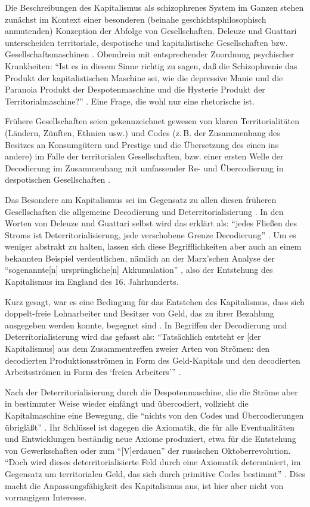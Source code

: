 \documentclass[12pt,
               DIV13,
               paper=a4,
               twoside=false,
               onehalfspacing,
               bibliography=totoc,
               toc=graduated,
               draft,
               ]{scrartcl}
\newcommand{\pc}[2]{\parencite[#1]{#2}}
\newcommand{\vgl}[2]{\parencite[vgl.][#1]{#2}}
\newcommand{\worries}[1]{\ifdraft{\textcolor{blue}{\texttt{(#1)}}}{}}
\newcommand{\dg}{Deleuze und Guattari\xspace}
\begin{document}
Die Beschreibungen des Kapitalismus als schizophrenes System im
Ganzen stehen zunächst im Kontext einer besonderen (beinahe
geschichtsphilosophisch anmutenden) Konzeption der Abfolge von
Gesellschaften. Deleuze und Guattari unterscheiden territoriale,
despotische und kapitalistische Gesellschaften bzw.
Gesellschaftsmaschinen \vgl{338}{ao}. Obendrein mit entsprechender
Zuordnung psychischer Krankheiten: "`Ist es in diesem Sinne richtig zu
sagen, daß die Schizophrenie das Produkt der kapitalistischen Maschine
sei, wie die depressive Manie und die Paranoia Produkt der
Despotenmaschine und die Hysterie Produkt der Territorialmaschine?"'
\pc{44}{ao}. Eine Frage, die wohl nur eine rhetorische ist.

Frühere Gesellschaften seien gekennzeichnet gewesen von klaren
Territorialitäten (Ländern, Zünften, Ethnien usw.) und Codes (z.\,B.
der Zusammenhang des Besitzes an Konsumgütern und Prestige und die
Übersetzung des einen ins andere) \vgl{318, 332}{ao} im Falle der
territorialen Gesellschaften, bzw. einer ersten Welle der Decodierung
im Zusammenhang mit umfassender Re- und Übercodierung \worries{BSP} in
despotischen Gesellschaften \vgl{337}{ao}.

Das Besondere am Kapitalismus sei im Gegensatz zu allen diesen
früheren Gesellschaften die allgemeine Decodierung und
Deterritorialisierung \vgl{337}{ao}. In den Worten von \dg selbst wird
das erklärt als: "`jedes Fließen des Stroms ist Deterritorialisierung,
jede verschobene Grenze Decodierung"' \pc{298}{ao}. Um es weniger
abstrakt zu halten, lassen sich diese Begrifflichkeiten aber auch an
einem bekannten Beispiel verdeutlichen, nämlich an der Marx'schen
Analyse der "`sogenannte[n] ursprüngliche[n] Akkumulation"'
\pc{741}{kap}, also der Entstehung des Kapitalismus im England des 16.
Jahrhunderts.

Kurz gesagt, war es eine Bedingung für das Entstehen des Kapitalismus,
dass sich doppelt-freie Lohnarbeiter und Besitzer von Geld, das zu
ihrer Bezahlung ausgegeben werden konnte, begegnet sind
\vgl{742}{kap}. In Begriffen der Decodierung und Deterritorialisierung
wird das gefasst als: \enquote{Tatsächlich entsteht er [der Kapitalismus] aus
dem Zusammentreffen zweier Arten von Strömen: den decodierten
Produktionsströmen in Form des Geld-Kapitals und den decodierten
Arbeitsströmen in Form des \enquote{freien Arbeiters}} \pc{44}{ao}.

Nach der Deterritorialisierung durch die Despotenmaschine, die die
Ströme aber in bestimmter Weise wieder einfängt und übercodiert,
vollzieht die Kapitalmaschine eine Bewegung, die "`nichts von den
Codes und Übercodierungen übrigläßt"' \pc{337}{ao}. Ihr Schlüssel ist
dagegen die Axiomatik, die für alle Eventualitäten und Entwicklungen
beständig neue Axiome produziert, etwa für die Entstehung von
Gewerkschaften oder zum "`[V]erdauen"' \pc{326}{ao} der russischen
Oktoberrevolution. "`Doch wird dieses deterritorialisierte Feld durch
eine Axiomatik determiniert, im Gegensatz um territorialen Geld, das
sich durch primitive Codes bestimmt"' \pc{322}{ao}. Dies macht die
Anpassungsfähigkeit des Kapitalismus aus, ist hier aber nicht von
vorrangigem Interesse.
\end{document}
